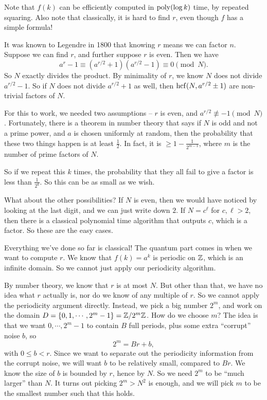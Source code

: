 Note that $f(k)$ can be efficiently computed in $\operatorname{poly}(\log k)$ time, by repeated squaring. Also note that classically, it is hard to find $r$, even though $f$ has a simple formula!

It was known to Legendre in 1800 that knowing $r$ means we can factor $n$. Suppose we can find $r$, and further suppose $r$ is even. Then we have
\[
  a^r - 1 \equiv (a^{r/2} + 1)(a^{r/2} - 1) \equiv 0 \pmod N.
\]
So $N$ exactly divides the product. By minimality of $r$, we know $N$ does not divide $a^{r/2} - 1$. So if $N$ does not divide $a^{r/2} + 1$ as well, then $\operatorname{hcf}(N, a^{r/2} \pm 1)$ are non-trivial factors of $N$.

For this to work, we needed two assumptions -- $r$ is even, and $a^{r/2} \not\equiv -1 \pmod N$. Fortunately, there is a theorem in number theory that says if $N$ is odd and not a prime power, and $a$ is chosen uniformly at random, then the probability that these two things happen is at least $\frac{1}{2}$. In fact, it is $\geq 1 - \frac{1}{2^{m - 1}}$, where $m$ is the number of prime factors of $N$.

So if we repeat this $k$ times, the probability that they all fail to give a factor is less than $\frac{1}{2^k}$. So this can be as small as we wish.

What about the other possibilities? If $N$ is even, then we would have noticed by looking at the last digit, and we can just write down $2$. If $N = c^\ell$ for $c, \ell > 2$, then there is a classical polynomial time algorithm that outputs $c$, which is a factor. So these are the easy cases.

Everything we've done so far is classical! The quantum part comes in when we want to compute $r$. We know that $f(k) = a^k$ is periodic on $\mathbb{Z}$, which is an infinite domain. So we cannot just apply our periodicity algorithm.

By number theory, we know that $r$ is at most $N$. But other than that, we have no idea what $r$ actually is, nor do we know of any multiple of $r$. So we cannot apply the periodicity argument directly. Instead, we pick a big number $2^m$, and work on the domain $D = \{0, 1, \cdots, 2^m - 1\} = \mathbb{Z}/2^m \mathbb{Z}$. How do we choose $m$? The idea is that we want $0, \cdots, 2^m - 1$ to contain $B$ full periods, plus some extra ``corrupt'' noise $b$, so
\[
  2^m = Br + b,
\]
with $0 \leq b < r$. Since we want to separate out the periodicity information from the corrupt noise, we will want $b$ to be relatively small, compared to $Br$. We know the size of $b$ is bounded by $r$, hence by $N$. So we need $2^m$ to be ``much larger'' than $N$. It turns out picking $2^m > N^2$ is enough, and we will pick $m$ to be the smallest number such that this holds.

